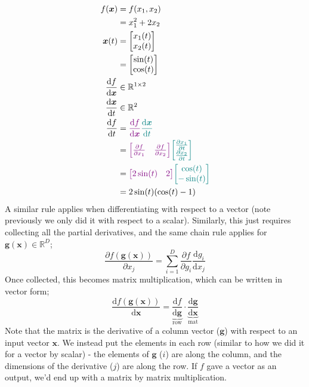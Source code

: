 \documentclass[a4paper, 12pt]{article}
\newcommand{\pdif}[2]{\frac{\partial #1}{\partial #2}}
\newcommand{\dif}[2]{\frac{\mathrm{d}#1}{\mathrm{d}#2}}
\newcommand{\summation}[2]{\sum\limits_{#1}^{#2}}
\renewcommand{\vec}[1]{\boldsymbol{#1}}
\newcommand{\violet}[1]{\textcolor{violet}{#1}}
\newcommand{\teal}[1]{\textcolor{teal}{#1}}
\begin{document}
            \begin{align*}
                f(\vec{x}) & = f(x_1, x_2) \\
                & = x_1^2 + 2x_2 \\
                \vec{x}(t) & = \begin{bmatrix}
                    x_1(t) \\ x_2(t)
                \end{bmatrix} \\
                & = \begin{bmatrix}
                    \sin(t) \\ \cos(t)
                \end{bmatrix} \\
                \dif{f}{\vec{x}} & \in \mathbb{R}^{1 \times 2} \\
                \dif{\vec{x}}{t} & \in \mathbb{R}^2 \\
                \dif{f}{t} & = \violet{\dif{f}{\vec{x}}} \teal{\dif{\vec{x}}{t}} \\
                & = \violet{\begin{bmatrix}
                    \pdif{f}{x_1} & \pdif{f}{x_2}
                \end{bmatrix}} \teal{\begin{bmatrix}
                    \pdif{x_1}{t} \\ \pdif{x_2}{t}
                \end{bmatrix}} \\
                & = \violet{\begin{bmatrix}
                    2\sin(t) & 2
                \end{bmatrix}} \teal{\begin{bmatrix}
                    \cos(t) \\ -\sin(t)
                \end{bmatrix}} \\
                & = 2\sin(t)(\cos(t) - 1)
            \end{align*}
            A similar rule applies when differentiating with respect to a vector (note previously we only did it with respect to a scalar).
            Similarly, this just requires collecting all the partial derivatives, and the same chain rule applies for $\vec{g}(\vec{x}) \in \mathbb{R}^D$;
            $$\pdif{f(\vec{g}(\vec{x}))}{x_j} = \summation{i = 1}{D} \pdif{f}{g_i} \dif{g_i}{x_j}$$ %
            Once collected, this becomes matrix multiplication, which can be written in vector form;
            $$\dif{f(\vec{g}(\vec{x}))}{\vec{x}} = \underbrace{\dif{f}{\vec{g}}}_\text{row} \cdot \underbrace{\dif{\vec{g}}{\vec{x}}}_\text{mat}$$
            Note that the matrix is the derivative of a column vector ($\vec{g}$) with respect to an input vector $\vec{x}$.
            We instead put the elements in each row (similar to how we did it for a vector by scalar) - the elements of $\vec{g}$ ($i$) are along the column, and the dimensions of the derivative ($j$) are along the row.
            If $f$ gave a vector as an output, we'd end up with a matrix by matrix multiplication.
            \medskip
\end{document}
